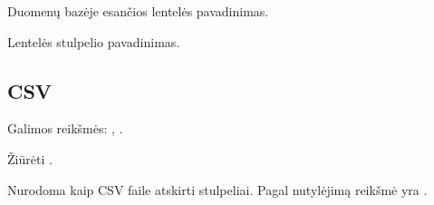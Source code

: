 \documentclass[letterpaper,10pt,lithuanian]{sphinxmanual}
\begin{document}
\begin{fulllineitems}

\pysigstartsignatures
\pysigline
{}
\pysigstopsignatures
\sphinxAtStartPar
Duomenų bazėje esančios lentelės pavadinimas.

\end{fulllineitems}



\begin{fulllineitems}

\pysigstartsignatures
\pysigline
{}
\pysigstopsignatures
\sphinxAtStartPar
Lentelės stulpelio pavadinimas.

\end{fulllineitems}



\subsection{CSV}
\label{\detokenize{saltiniai:csv}}

\begin{fulllineitems}

\pysigstartsignatures
\pysigline
{}
\pysigstopsignatures
\sphinxAtStartPar
Galimos reikšmės: , .

\end{fulllineitems}



\begin{fulllineitems}

\pysigstartsignatures
\pysigline
{}
\pysigstopsignatures
\sphinxAtStartPar
Žiūrėti {\hyperref[\detokenize{formules:failai}]{}}.

\end{fulllineitems}



\begin{fulllineitems}

\pysigstartsignatures
\pysigline
{}
\pysigstopsignatures{}

\begin{fulllineitems}
\label{\detokenize{saltiniai:tabular}}
\pysigstartsignatures
\pysiglinewithargsret
{}
{}
{}
\pysigstopsignatures
\sphinxAtStartPar
Nurodoma kaip CSV faile atskirti stulpeliai. Pagal nutylėjimą
 reikšmė yra \sphinxcode{\sphinxupquote{,}}.

\end{fulllineitems}


\end{fulllineitems}
\end{document}
